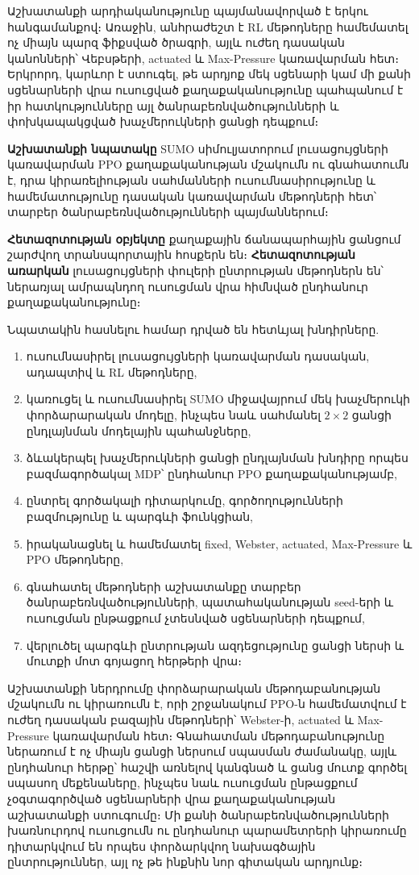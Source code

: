 \documentclass[12pt,a4paper]{extreport}
\begin{document}
Աշխատանքի արդիականությունը պայմանավորված է երկու հանգամանքով։ Առաջին, անհրաժեշտ է RL մեթոդները համեմատել ոչ միայն պարզ ֆիքսված ծրագրի, այլև ուժեղ դասական կանոնների՝ Վեբսթերի, actuated և Max-Pressure կառավարման հետ։ Երկրորդ, կարևոր է ստուգել, թե արդյոք մեկ սցենարի կամ մի քանի սցենարների վրա ուսուցված քաղաքականությունը պահպանում է իր հատկությունները այլ ծանրաբեռնվածությունների և փոխկապակցված խաչմերուկների ցանցի դեպքում։

\textbf{Աշխատանքի նպատակը} SUMO սիմուլյատորում լուսացույցների կառավարման PPO քաղաքականության մշակումն ու գնահատումն է, դրա կիրառելիության սահմանների ուսումնասիրությունը և համեմատությունը դասական կառավարման մեթոդների հետ՝ տարբեր ծանրաբեռնվածությունների պայմաններում։

\textbf{Հետազոտության օբյեկտը} քաղաքային ճանապարհային ցանցում շարժվող տրանսպորտային հոսքերն են։ \textbf{Հետազոտության առարկան} լուսացույցների փուլերի ընտրության մեթոդներն են՝ ներառյալ ամրապնդող ուսուցման վրա հիմնված ընդհանուր քաղաքականությունը։

Նպատակին հասնելու համար դրված են հետևյալ խնդիրները.
\begin{enumerate}
  \item ուսումնասիրել լուսացույցների կառավարման դասական, ադապտիվ և RL մեթոդները,
  \item կառուցել և ուսումնասիրել SUMO միջավայրում մեկ խաչմերուկի փորձարարական մոդելը, ինչպես նաև սահմանել $2\times2$ ցանցի ընդլայնման մոդելային պահանջները,
  \item ձևակերպել խաչմերուկների ցանցի ընդլայնման խնդիրը որպես բազմագործակալ MDP՝ ընդհանուր PPO քաղաքականությամբ,
  \item ընտրել գործակալի դիտարկումը, գործողությունների բազմությունը և պարգևի ֆունկցիան,
  \item իրականացնել և համեմատել fixed, Webster, actuated, Max-Pressure և PPO մեթոդները,
  \item գնահատել մեթոդների աշխատանքը տարբեր ծանրաբեռնվածությունների, պատահականության seed-երի և ուսուցման ընթացքում չտեսնված սցենարների դեպքում,
  \item վերլուծել պարգևի ընտրության ազդեցությունը ցանցի ներսի և մուտքի մոտ գոյացող հերթերի վրա։
\end{enumerate}

Աշխատանքի ներդրումը փորձարարական մեթոդաբանության մշակումն ու կիրառումն է, որի շրջանակում PPO-ն համեմատվում է ուժեղ դասական բազային մեթոդների՝ Webster-ի, actuated և Max-Pressure կառավարման հետ։ Գնահատման մեթոդաբանությունը ներառում է ոչ միայն ցանցի ներսում սպասման ժամանակը, այլև ընդհանուր հերթը՝ հաշվի առնելով կանգնած և ցանց մուտք գործել սպասող մեքենաները, ինչպես նաև ուսուցման ընթացքում չօգտագործված սցենարների վրա քաղաքականության աշխատանքի ստուգումը։ Մի քանի ծանրաբեռնվածությունների խառնուրդով ուսուցումն ու ընդհանուր պարամետրերի կիրառումը դիտարկվում են որպես փորձարկվող նախագծային ընտրություններ, այլ ոչ թե ինքնին նոր գիտական արդյունք։
\end{document}
